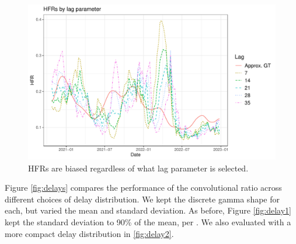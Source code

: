 \documentclass{article}
\begin{document}
\begin{figure}
    \centering
    \includegraphics[width=0.7\linewidth]{Figures/Real/hfrs_by_lag.pdf}
    \caption{HFRs are biased regardless of what lag parameter is selected.}
    \label{fig:lag}
\end{figure}


Figure \ref{fig:delays} compares the performance of the convolutional ratio across different choices of delay distribution. We kept the discrete gamma shape for each, but varied the mean and standard deviation. As before, Figure \ref{fig:delay1} kept the standard deviation to 90\% of the mean, per \citet{UKdelay}. We also evaluated with a more compact delay distribution in \ref{fig:delay2}. 

\end{document}
